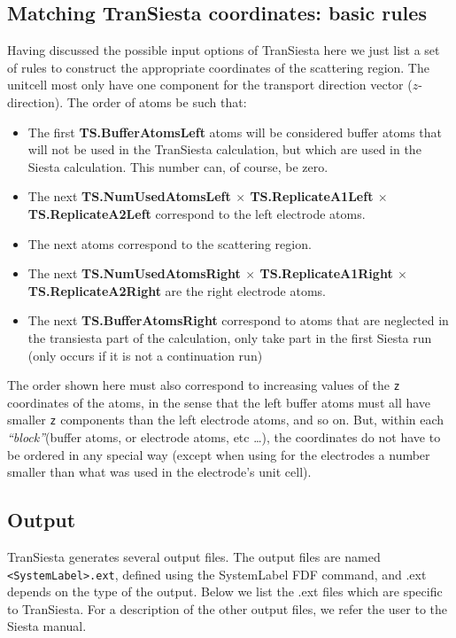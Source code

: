 \documentclass[11pt]{article}
\begin{document}
\subsection{  Matching   {\sc TranSiesta} coordinates: basic rules}
Having discussed the possible input options of {\sc TranSiesta} here
we just list a set of rules to construct the appropriate coordinates
of the scattering region. The unitcell most only have one component for 
the transport direction vector ($z$-direction). The order of atoms be 
such that:
\begin{itemize}
\item
The first {\bf TS.BufferAtomsLeft} atoms will be considered buffer
atoms that will not be used in the {\sc TranSiesta} calculation, but
which are used in the {\sc Siesta} calculation. This number can, of
course, be zero.
\item The next {\bf TS.NumUsedAtomsLeft $\times$ TS.ReplicateA1Left
    $\times$ TS.ReplicateA2Left} correspond to the left electrode atoms.

\item  The next atoms correspond to the scattering region.
\item  The next {\bf TS.NumUsedAtomsRight $\times$ TS.ReplicateA1Right
    $\times$ TS.ReplicateA2Right} are the right electrode atoms.
\item The next {\bf TS.BufferAtomsRight} correspond to atoms that are
  neglected in the transiesta part of the calculation, only take part
  in the first {\sc Siesta} run (only occurs if it is not a
  continuation run)
\end{itemize}

The order shown here must also correspond to increasing values of the
{\tt z} coordinates of the atoms, in the sense that the left buffer
atoms must all have smaller {\tt z} components than the left electrode
atoms, and so on. But, within each {\it ``block''}(buffer atoms, or
electrode atoms, etc \ldots), the coordinates do not have to be
ordered in any special way (except when using for the electrodes a
number smaller than what was used in the electrode's unit cell).

\subsection{Output}

{\sc TranSiesta} generates several output files.  The output files are
named {\tt <SystemLabel>.ext}, defined using the SystemLabel FDF
command, and .ext depends on the type of the output.  Below we list
the .ext files which are specific to {\sc TranSiesta}.  For a description of
the other output files, we refer the user to the {\sc Siesta} manual.
\end{document}
